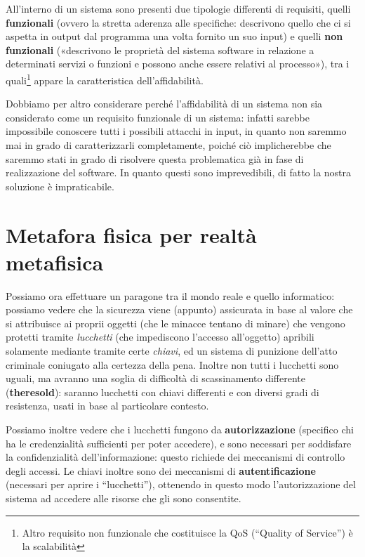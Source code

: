 All'interno di un sistema sono presenti  due tipologie 
differenti di requisiti, quelli \textbf{funzionali} (ovvero la stretta aderenza
alle specifiche: descrivono quello che ci si aspetta in output dal programma
una volta fornito un suo input) e quelli \textbf{non funzionali} («descrivono le 
proprietà del sistema software in relazione a
determinati servizi o funzioni e possono anche essere relativi al
processo»), tra i quali\footnote{Altro requisito non funzionale che costituisce
la QoS (``Quality of Service'') è la scalabilità} appare la caratteristica dell'affidabilità. 


Dobbiamo per altro considerare perché l'affidabilità di un sistema non sia
considerato come un requisito funzionale di un sistema: infatti  sarebbe impossibile 
conoscere tutti i possibili attacchi in input, in quanto
non saremmo mai in grado di caratterizzarli completamente, poiché ciò 
implicherebbe che saremmo stati in grado di risolvere questa problematica già
in fase di realizzazione del software. In quanto questi
sono imprevedibili, di fatto la nostra soluzione è impraticabile. 

\section{Metafora fisica per realtà metafisica}
Possiamo ora effettuare un paragone tra il mondo reale e quello informatico:
possiamo vedere che la sicurezza viene (appunto) assicurata in base al
valore che si attribuisce ai proprii oggetti (che le minacce tentano di 
minare) che vengono protetti tramite \textit{lucchetti} (che impediscono l'accesso
all'oggetto) apribili solamente mediante tramite certe \textit{chiavi}, ed un 
sistema di punizione dell'atto criminale coniugato alla certezza della
pena. Inoltre non tutti i lucchetti sono uguali, ma avranno una soglia di
difficoltà di scassinamento differente (\textbf{theresold}): saranno lucchetti
con chiavi differenti e con diversi gradi di resistenza, usati in base al
particolare contesto.

Possiamo inoltre vedere che i lucchetti fungono da \textbf{autorizzazione} (specifico
chi ha le credenzialità sufficienti per poter accedere), e sono necessari per
soddisfare la confidenzialità dell'informazione: questo richiede dei meccanismi
di controllo degli accessi. Le chiavi inoltre sono dei meccanismi di 
\textbf{autentificazione} (necessari per aprire i ``lucchetti''), ottenendo in questo
modo l'autorizzazione del sistema ad accedere alle risorse che gli sono consentite.


